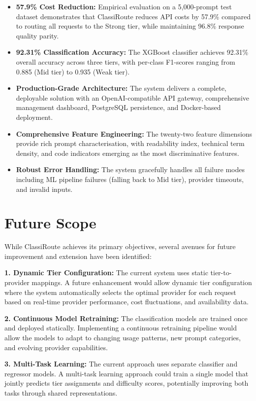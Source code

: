 \documentclass[oneside,12pt,a4paper]{report}
\begin{document}
\begin{itemize}
  \item \textbf{57.9\% Cost Reduction:} Empirical evaluation on a 5,000-prompt test dataset demonstrates that ClassiRoute reduces API costs by 57.9\% compared to routing all requests to the Strong tier, while maintaining 96.8\% response quality parity.
  \item \textbf{92.31\% Classification Accuracy:} The XGBoost classifier achieves 92.31\% overall accuracy across three tiers, with per-class F1-scores ranging from 0.885 (Mid tier) to 0.935 (Weak tier).
  \item \textbf{Production-Grade Architecture:} The system delivers a complete, deployable solution with an OpenAI-compatible API gateway, comprehensive management dashboard, PostgreSQL persistence, and Docker-based deployment.
  \item \textbf{Comprehensive Feature Engineering:} The twenty-two feature dimensions provide rich prompt characterisation, with readability index, technical term density, and code indicators emerging as the most discriminative features.
  \item \textbf{Robust Error Handling:} The system gracefully handles all failure modes including ML pipeline failures (falling back to Mid tier), provider timeouts, and invalid inputs.
\end{itemize}

\section{Future Scope}

While ClassiRoute achieves its primary objectives, several avenues for future improvement and extension have been identified:

\textbf{1. Dynamic Tier Configuration:} The current system uses static tier-to-provider mappings. A future enhancement would allow dynamic tier configuration where the system automatically selects the optimal provider for each request based on real-time provider performance, cost fluctuations, and availability data.

\textbf{2. Continuous Model Retraining:} The classification models are trained once and deployed statically. Implementing a continuous retraining pipeline would allow the models to adapt to changing usage patterns, new prompt categories, and evolving provider capabilities.

\textbf{3. Multi-Task Learning:} The current approach uses separate classifier and regressor models. A multi-task learning approach could train a single model that jointly predicts tier assignments and difficulty scores, potentially improving both tasks through shared representations.
\end{document}
